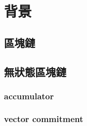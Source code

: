 \chapter{背景}
\label{c:background}

\section{區塊鏈}
\section{無狀態區塊鏈}
\subsection{accumulator}
\subsection{vector commitment}
